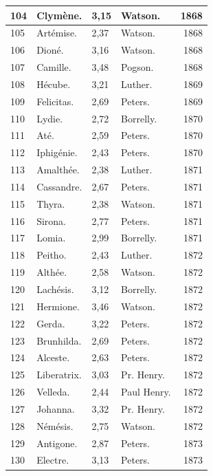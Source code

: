 \documentclass[a4paper, 11pt, oneside, landscape]{article}
\begin{document}
\begin{landscape}
\begin{center}
\begin{longtable}{|p{10mm}|l|p{10mm}|l|r|}
        104 & Clymène. & 3,15 & Watson. & 1868 \\ \hline
        105 & Artémise. & 2,37 & Watson. & 1868 \\ \hline
        106 & Dioné. & 3,16 & Watson. & 1868 \\ \hline
        107 & Camille. & 3,48 & Pogson. & 1868 \\ \hline
        108 & Hécube. & 3,21 & Luther. & 1869 \\ \hline
        109 & Felicitas. & 2,69 & Peters. & 1869 \\ \hline
        110 & Lydie. & 2,72 & Borrelly. & 1870 \\ \hline
        111 & Até. & 2,59 & Peters. & 1870 \\ \hline
        112 & Iphigénie. & 2,43 & Peters. & 1870 \\ \hline
        113 & Amalthée. & 2,38 & Luther. & 1871 \\ \hline
        114 & Cassandre. & 2,67 & Peters. & 1871 \\ \hline
        115 & Thyra. & 2,38 & Watson. & 1871 \\ \hline
        116 & Sirona. & 2,77 & Peters. & 1871 \\ \hline
        117 & Lomia. & 2,99 & Borrelly. & 1871 \\ \hline
        118 & Peitho. & 2,43 & Luther. & 1872 \\ \hline
        119 & Althée. & 2,58 & Watson. & 1872 \\ \hline
        120 & Lachésis. & 3,12 & Borrelly. & 1872 \\ \hline
        121 & Hermione. & 3,46 & Watson. & 1872 \\ \hline
        122 & Gerda. & 3,22 & Peters. & 1872 \\ \hline
        123 & Brunhilda. & 2,69 & Peters. & 1872 \\ \hline
        124 & Alceste. & 2,63 & Peters. & 1872 \\ \hline
        125 & Liberatrix. & 3,03 & Pr. Henry. & 1872 \\ \hline
        126 & Velleda. & 2,44 & Paul Henry. & 1872 \\ \hline
        127 & Johanna. & 3,32 & Pr. Henry. & 1872 \\ \hline
        128 & Némésis. & 2,75 & Watson. & 1872 \\ \hline
        129 & Antigone. & 2,87 & Peters. & 1873 \\ \hline
        130 & Electre. & 3,13 & Peters. & 1873 \\ \hline

\end{longtable}
\end{center}
\end{landscape}
\end{document}
